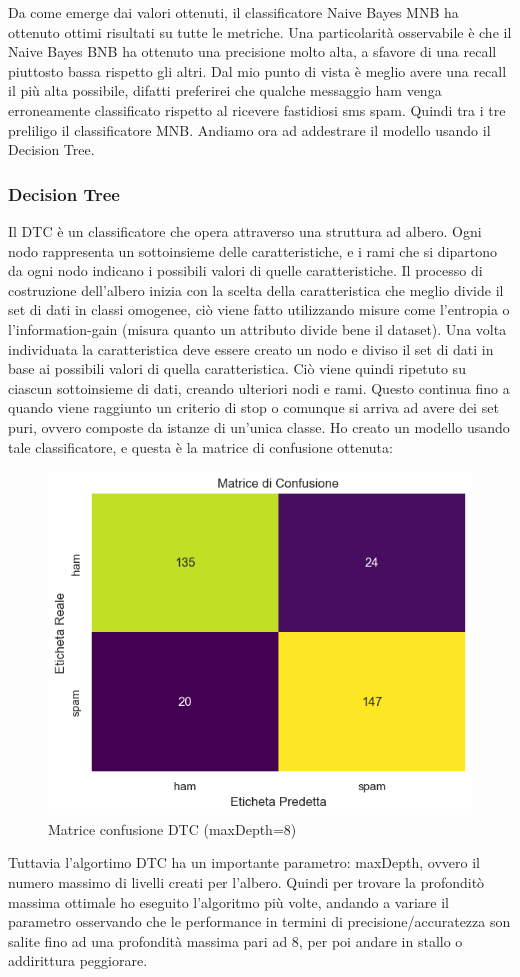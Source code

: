 \documentclass[]{article}
\begin{document}
                    Da come emerge dai valori ottenuti, il classificatore Naive Bayes MNB ha ottenuto ottimi risultati su tutte le metriche. Una particolarità osservabile è che il Naive Bayes BNB ha ottenuto una precisione molto alta, a sfavore di una recall piuttosto bassa rispetto gli altri. Dal mio punto di vista è meglio avere una recall il più alta possibile, difatti preferirei che qualche messaggio ham venga erroneamente classificato rispetto al ricevere fastidiosi sms spam. Quindi tra i tre preliligo il classificatore MNB.
                    Andiamo ora ad addestrare il modello usando il Decision Tree.

                \subsubsection{Decision Tree}
                    Il DTC \cite{wikiDTC} è un classificatore che opera attraverso una struttura ad albero. Ogni nodo rappresenta un sottoinsieme delle caratteristiche, e i rami che si dipartono da ogni nodo indicano i possibili valori di quelle caratteristiche.
                    Il processo di costruzione dell'albero inizia con la scelta della caratteristica che meglio divide il set di dati in classi omogenee, ciò viene fatto utilizzando misure come l'entropia o l'information-gain (misura quanto un attributo divide bene il dataset). Una volta individuata la caratteristica deve essere creato un nodo e  diviso il set di dati in base ai possibili valori di quella caratteristica. Ciò viene quindi ripetuto su ciascun sottoinsieme di dati, creando ulteriori nodi e rami. Questo continua fino a quando viene raggiunto un criterio di stop o comunque si arriva ad avere dei set puri, ovvero composte da istanze di un'unica classe.
                    Ho creato un modello usando tale classificatore, e questa è la matrice di confusione ottenuta:
                    \begin{figure}[H]
                        \centering
                        \includegraphics[width=0.5\linewidth]{images/dtcResult.png}
                        \caption{Matrice confusione DTC (maxDepth=8)}
                        \label{fig:enter-label}
                    \end{figure}
                    Tuttavia l'algortimo DTC ha un importante parametro: maxDepth, ovvero il numero massimo di livelli creati per l'albero. Quindi per trovare la profonditò massima ottimale ho eseguito l'algoritmo più volte, andando a variare il parametro osservando che le performance in termini di precisione/accuratezza son salite fino ad una profondità massima pari ad 8, per poi andare in stallo o addirittura peggiorare.
\end{document}
